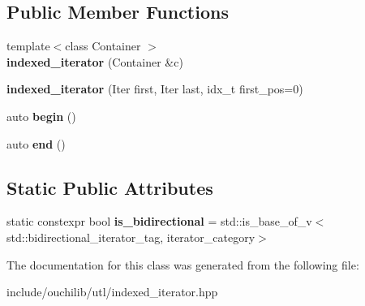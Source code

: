 \subsection*{Public Member Functions}
\begin{DoxyCompactItemize}
\item 
\mbox{\label{classouchi_1_1indexed__iterator_a222192e8cdb78a9b91747c47541e9389}} 
{\footnotesize template$<$class Container $>$ }\\{\bfseries indexed\+\_\+iterator} (Container \&c)
\item 
\mbox{\label{classouchi_1_1indexed__iterator_a9b4c731dea81846ea678e80fe7ab6943}} 
{\bfseries indexed\+\_\+iterator} (Iter first, Iter last, idx\+\_\+t first\+\_\+pos=0)
\item 
\mbox{\label{classouchi_1_1indexed__iterator_a66c264ff8432242532cd59262bbe1f9e}} 
auto {\bfseries begin} ()
\item 
\mbox{\label{classouchi_1_1indexed__iterator_abd3e5b9d26b66fff4d674db0fd573e18}} 
auto {\bfseries end} ()
\end{DoxyCompactItemize}
\subsection*{Static Public Attributes}
\begin{DoxyCompactItemize}
\item 
\mbox{\label{classouchi_1_1indexed__iterator_adcfd7ce2a8c1c9d6fe325330f605284e}} 
static constexpr bool {\bfseries is\+\_\+bidirectional} = std\+::is\+\_\+base\+\_\+of\+\_\+v$<$std\+::bidirectional\+\_\+iterator\+\_\+tag, iterator\+\_\+category$>$
\end{DoxyCompactItemize}


The documentation for this class was generated from the following file\+:\begin{DoxyCompactItemize}
\item 
include/ouchilib/utl/indexed\+\_\+iterator.\+hpp\end{DoxyCompactItemize}

